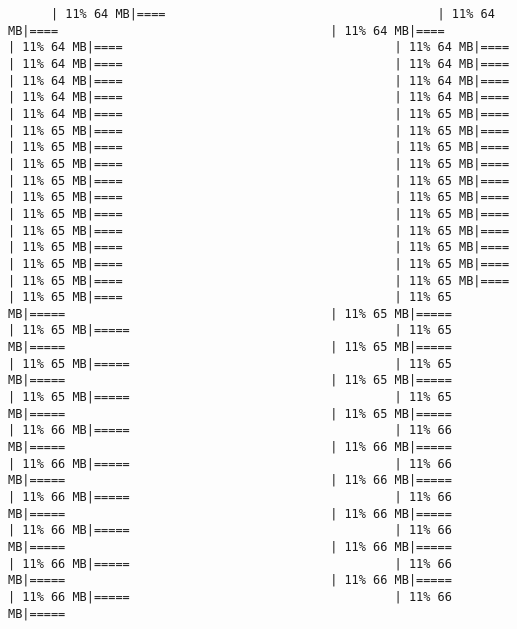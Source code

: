 \documentclass[
]{article}
\begin{document}
\begin{verbatim}
      | 11% 64 MB|====                                      | 11% 64 MB|====                                      | 11% 64 MB|====                                      | 11% 64 MB|====                                      | 11% 64 MB|====                                      | 11% 64 MB|====                                      | 11% 64 MB|====                                      | 11% 64 MB|====                                      | 11% 64 MB|====                                      | 11% 64 MB|====                                      | 11% 64 MB|====                                      | 11% 64 MB|====                                      | 11% 65 MB|====                                      | 11% 65 MB|====                                      | 11% 65 MB|====                                      | 11% 65 MB|====                                      | 11% 65 MB|====                                      | 11% 65 MB|====                                      | 11% 65 MB|====                                      | 11% 65 MB|====                                      | 11% 65 MB|====                                      | 11% 65 MB|====                                      | 11% 65 MB|====                                      | 11% 65 MB|====                                      | 11% 65 MB|====                                      | 11% 65 MB|====                                      | 11% 65 MB|====                                      | 11% 65 MB|====                                      | 11% 65 MB|====                                      | 11% 65 MB|====                                      | 11% 65 MB|====                                      | 11% 65 MB|====                                      | 11% 65 MB|====                                      | 11% 65 MB|====                                      | 11% 65 MB|=====                                     | 11% 65 MB|=====                                     | 11% 65 MB|=====                                     | 11% 65 MB|=====                                     | 11% 65 MB|=====                                     | 11% 65 MB|=====                                     | 11% 65 MB|=====                                     | 11% 65 MB|=====                                     | 11% 65 MB|=====                                     | 11% 65 MB|=====                                     | 11% 65 MB|=====                                     | 11% 66 MB|=====                                     | 11% 66 MB|=====                                     | 11% 66 MB|=====                                     | 11% 66 MB|=====                                     | 11% 66 MB|=====                                     | 11% 66 MB|=====                                     | 11% 66 MB|=====                                     | 11% 66 MB|=====                                     | 11% 66 MB|=====                                     | 11% 66 MB|=====                                     | 11% 66 MB|=====                                     | 11% 66 MB|=====                                     | 11% 66 MB|=====                                     | 11% 66 MB|=====                                     | 11% 66 MB|=====                                     | 11% 66 MB|=====                                     | 11% 66 MB|=====  
\end{verbatim}
\end{document}
